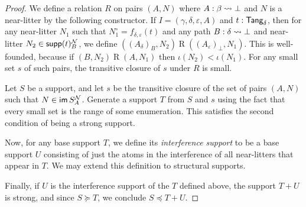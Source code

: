 \begin{proof}
  \leanok
  We define a relation \( R \) on pairs \( (A, N) \) where \( A : \beta \rightsquigarrow \bot \) and \( N \) is a near-litter by the following constructor.
  If \( I = (\gamma,\delta,\varepsilon,A) \) and \( t : \mathsf{Tang}_\delta \), then for any near-litter \( N_1 \) such that \( N_1^\circ = f_{\delta,\varepsilon}(t) \) and any path \( B : \delta \rightsquigarrow \bot \) and near-litter \( N_2 \in \operatorname{\mathsf{supp}}(t)_B^{\mathcal N} \), we define \( ((A_\delta)_B, N_2) \mathrel{R} ((A_\varepsilon)_\bot, N_1) \).
  This is well-founded, because if \( (B, N_2) \mathrel{R} (A, N_1) \) then \( \iota(N_2) < \iota(N_1) \).
  For any small set \( s \) of such pairs, the transitive closure of \( s \) under \( R \) is small.

  Let \( S \) be a support, and let \( s \) be the transitive closure of the set of pairs \( (A, N) \) such that \( N \in \operatorname{\mathsf{im}} S_A^{\mathcal N} \).
  Generate a support \( T \) from \( S \) and \( s \) using the fact that every small set is the range of some enumeration.
  This satisfies the second condition of being a strong support.

  Now, for any base support \( T \), we define its \emph{interference support} to be a base support \( U \) consisting of just the atoms in the interference of all near-litters that appear in \( T \).
  We may extend this definition to structural supports.

  Finally, if \( U \) is the interference support of the \( T \) defined above, the support \( T + U \) is strong, and since \( S \succeq T \), we conclude \( S \preceq T + U \).
\end{proof}

